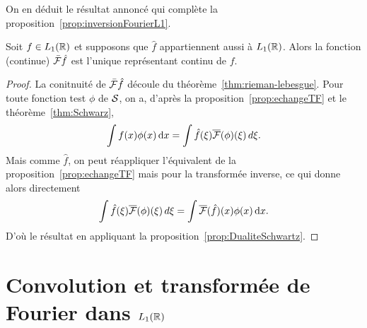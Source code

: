 On en d{\'e}duit le r{\'e}sultat annonc{\'e} qui compl{\`e}te la proposition~\ref{prop:inversionFourierL1}.
\begin{theorem}
Soit $f\in L_1(\mathbb{R})$ et supposons que $\hat{f}$ appartiennent aussi {\`a} $L_1(\mathbb{R})$. Alors
la fonction (continue) $\bar{\mathcal{F}} \hat{f}$ est l'unique
repr{\'e}sentant continu de $f$.
\end{theorem}
\begin{proof}
La conitnuit{\'e} de $\bar{\mathcal{F}} \hat{f}$ d{\'e}coule du th{\'e}or{\`e}me~\ref{thm:rieman-lebesgue}.
Pour toute fonction test $\phi$ de $\mathcal{S}$, on a, d'apr{\`e}s la proposition~\ref{prop:echangeTF} et le
th{\'e}or{\`e}me~\ref{thm:Schwarz},
$$
\int f(x) \phi(x)\,\mathrm{d} x=\int \hat{f}(\xi) \overline{\mathcal{F}}(\phi)(\xi)\,d\xi.
$$
Mais comme $\hat{f}$, on peut r{\'e}appliquer l'{\'e}quivalent de la proposition~\ref{prop:echangeTF} mais pour la transform{\'e}e
inverse, ce qui donne alors directement
$$
\int \hat{f}(\xi) \overline{\mathcal{F}}(\phi)(\xi)\,d\xi=\int \overline{\mathcal{F}}(\hat{f})(x) \phi(x) \,\mathrm{d} x.
$$
D'o{\`u} le r{\'e}sultat en appliquant la proposition~\ref{prop:DualiteSchwartz}.
\end{proof}

\section{Convolution et transformée de Fourier dans $L_1(\mathbb{R})$}
